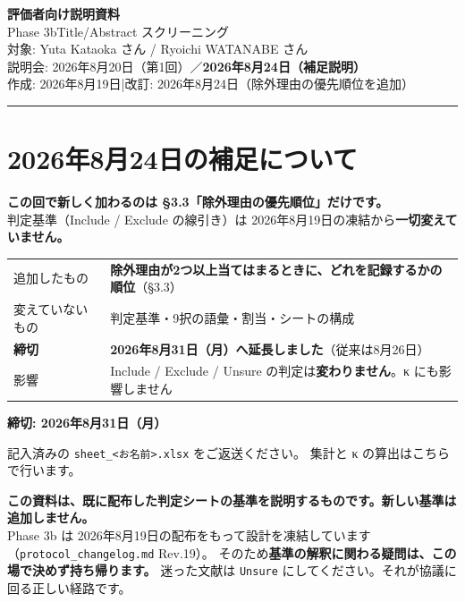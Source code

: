 \documentclass[a4paper]{ltjsarticle}
\newcommand{\keybox}[1]{%
  \par\medskip
  \noindent\colorbox{soft}{%
    \begin{minipage}{\dimexpr\linewidth-2\fboxsep\relax}
      \vspace{2pt}\centering\bfseries\large #1\vspace{4pt}
    \end{minipage}}%
  \par\medskip}
\newcommand{\notebox}[1]{%
  \par\medskip
  \noindent\colorbox{warn}{%
    \begin{minipage}{\dimexpr\linewidth-2\fboxsep\relax}
      \vspace{4pt}#1\vspace{4pt}
    \end{minipage}}%
  \par\medskip}
\newcommand{\addbox}[1]{%
  \par\medskip
  \noindent\colorbox{newc}{%
    \begin{minipage}{\dimexpr\linewidth-2\fboxsep\relax}
      \vspace{4pt}#1\vspace{4pt}
    \end{minipage}}%
  \par\medskip}
\newcommand{\rsn}[1]{\texttt{\small #1}}
\begin{document}
\begin{center}
  {\LARGE\bfseries\color{accent} 評価者向け説明資料}\\[4pt]
  {\large Phase 3b\quad Title/Abstract スクリーニング}\\[10pt]
  {\small 対象: Yuta Kataoka さん / Ryoichi WATANABE さん}\\[3pt]
  {\small 説明会: 2026年8月20日（第1回）／\textbf{2026年8月24日（補足説明）}}\\[3pt]
  {\small 作成: 2026年8月19日\quad|\quad 改訂: 2026年8月24日（除外理由の優先順位を追加）}
\end{center}

\vspace{4pt}
\noindent\textcolor{rulec}{\rule{\linewidth}{0.8pt}}
\vspace{6pt}

\section*{2026年8月24日の補足について}

\addbox{%
\textbf{この回で新しく加わるのは §3.3「除外理由の優先順位」だけです。}\\[3pt]
判定基準（Include / Exclude の線引き）は 2026年8月19日の凍結から\textbf{一切変えていません。}}

\begin{center}
\begin{tabularx}{\linewidth}{L{9em} X}
\toprule
追加したもの & \textbf{除外理由が2つ以上当てはまるときに、どれを記録するかの順位}（§3.3） \\
\addlinespace
変えていないもの & 判定基準・9択の語彙・割当・シートの構成 \\
\addlinespace
\textbf{締切} & \textbf{2026年8月31日（月）へ延長しました}（従来は8月26日） \\
\addlinespace
影響 & Include / Exclude / Unsure の判定は\textbf{変わりません}。κ にも影響しません \\
\bottomrule
\end{tabularx}
\end{center}

\keybox{締切: 2026年8月31日（月）}

\noindent
記入済みの \texttt{sheet\_\textless お名前\textgreater .xlsx} をご返送ください。
集計と κ の算出はこちらで行います。

\notebox{%
\textbf{この資料は、既に配布した判定シートの基準を説明するものです。新しい基準は追加しません。}\\[4pt]
Phase 3b は 2026年8月19日の配布をもって設計を凍結しています
（\texttt{protocol\_changelog.md} Rev.19）。
そのため\textbf{基準の解釈に関わる疑問は、この場で決めず持ち帰ります。}
迷った文献は \rsn{Unsure} にしてください。それが協議に回る正しい経路です。}
\end{document}
